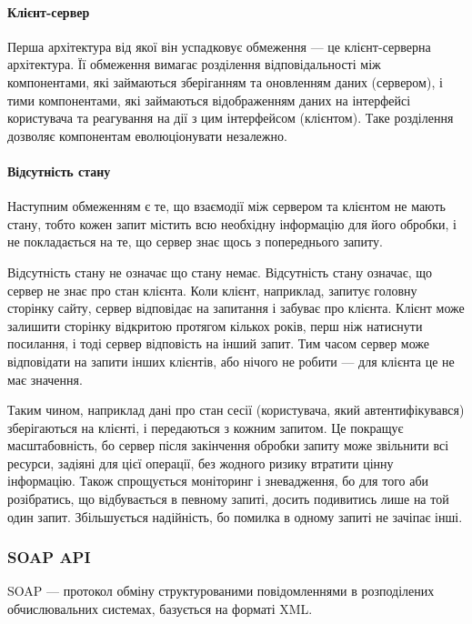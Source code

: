 \paragraph{Клієнт-сервер}

Перша архітектура від якої він успадковує обмеження — це клієнт-серверна архітектура. Її обмеження вимагає розділення відповідальності між компонентами, які займаються зберіганням та оновленням даних (сервером), і тими компонентами, які займаються відображенням даних на інтерфейсі користувача та реагування на дії з цим інтерфейсом (клієнтом). Таке розділення дозволяє компонентам еволюціонувати незалежно.

\paragraph{Відсутність стану}

Наступним обмеженням є те, що взаємодії між сервером та клієнтом не мають стану, тобто кожен запит містить всю необхідну інформацію для його обробки, і не покладається на те, що сервер знає щось з попереднього запиту.

Відсутність стану не означає що стану немає. Відсутність стану означає, що сервер не знає про стан клієнта. Коли клієнт, наприклад, запитує головну сторінку сайту, сервер відповідає на запитання і забуває про клієнта. Клієнт може залишити сторінку відкритою протягом кількох років, перш ніж натиснути посилання, і тоді сервер відповість на інший запит. Тим часом сервер може відповідати на запити інших клієнтів, або нічого не робити — для клієнта це не має значення.

Таким чином, наприклад дані про стан сесії (користувача, який автентифікувався) зберігаються на клієнті, і передаються з кожним запитом. Це покращує масштабовність, бо сервер після закінчення обробки запиту може звільнити всі ресурси, задіяні для цієї операції, без жодного ризику втратити цінну інформацію. Також спрощується моніторинг і зневадження, бо для того аби розібратись, що відбувається в певному запиті, досить подивитись лише на той один запит. Збільшується надійність, бо помилка в одному запиті не зачіпає інші.

\subsubsection{SOAP API}

SOAP — протокол обміну структурованими повідомленнями в розподілених обчислювальних системах, базується на форматі XML.

